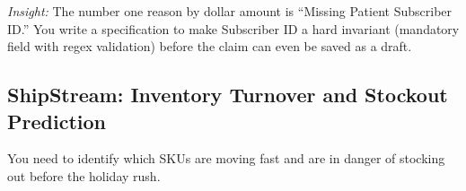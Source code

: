 \emph{Insight:} The number one reason by dollar amount is ``Missing
Patient Subscriber ID.'' You write a specification to make Subscriber ID
a hard invariant (mandatory field with regex validation) before the
claim can even be saved as a draft.

\subsection{ShipStream: Inventory Turnover and Stockout
Prediction}\label{shipstream-inventory-turnover-and-stockout-prediction}

You need to identify which SKUs are moving fast and are in danger of
stocking out before the holiday rush.

\begin{Shaded}
\begin{Highlighting}[]
\OperatorTok{*}  \OperatorTok{/} \NormalTok{(}\NormalTok{)) }\OperatorTok{*}  
\OperatorTok{=}
\OperatorTok{=}
\OperatorTok{=}
\OperatorTok{\textgreater{}=}  \OperatorTok{{-}}  
 
\OperatorTok{*}  \OperatorTok{/} \NormalTok{(}\NormalTok{)) }\OperatorTok{*}  \OperatorTok{\textless{}} 
 \NormalTok{;}
\end{Highlighting}
\end{Shaded}

